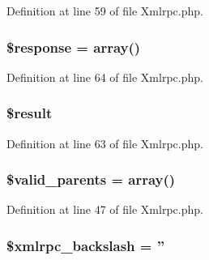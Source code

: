 Definition at line 59 of file Xmlrpc.\-php.

\hypertarget{class_c_i___xmlrpc_af4b6fb1bbc77ccc05f10da3b16935b99}{
\subsubsection[{\$response}]{\setlength{\rightskip}{0pt plus 5cm}\$response = array()}}\label{class_c_i___xmlrpc_af4b6fb1bbc77ccc05f10da3b16935b99}


Definition at line 64 of file Xmlrpc.\-php.

\hypertarget{class_c_i___xmlrpc_a112ef069ddc0454086e3d1e6d8d55d07}{
\subsubsection[{\$result}]{\setlength{\rightskip}{0pt plus 5cm}\$result}}\label{class_c_i___xmlrpc_a112ef069ddc0454086e3d1e6d8d55d07}


Definition at line 63 of file Xmlrpc.\-php.

\hypertarget{class_c_i___xmlrpc_a801945a338a9dee5f723c00cb71657b7}{
\subsubsection[{\$valid\-\_\-parents}]{\setlength{\rightskip}{0pt plus 5cm}\$valid\-\_\-parents = array()}}\label{class_c_i___xmlrpc_a801945a338a9dee5f723c00cb71657b7}


Definition at line 47 of file Xmlrpc.\-php.

\hypertarget{class_c_i___xmlrpc_a2bfcef776e3e3cd8f7700e375c6ccaec}{
\subsubsection[{\$xmlrpc\-\_\-backslash}]{\setlength{\rightskip}{0pt plus 5cm}\$xmlrpc\-\_\-backslash = ''}}\label{class_c_i___xmlrpc_a2bfcef776e3e3cd8f7700e375c6ccaec}


